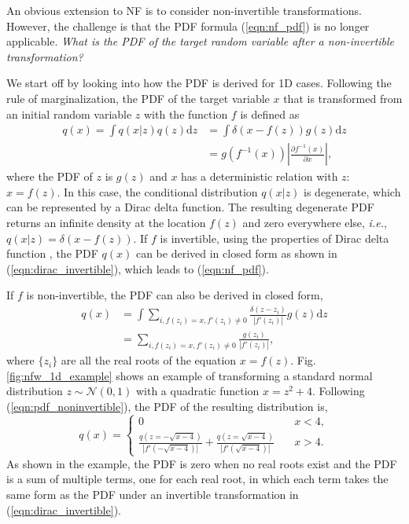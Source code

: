 \documentclass[twoside]{article}
\newcommand{\diff}{\text{d}}
\newcommand{\ie}{\textit{i.e.}}
\begin{document}
An obvious extension to NF is to consider non-invertible transformations. However, the challenge is that the PDF formula (\ref{eqn:nf_pdf}) is no longer applicable. \textit{What is the PDF of the target random variable after a non-invertible transformation?}

We start off by looking into how the PDF is derived for 1D cases. Following the rule of marginalization, the PDF of the target variable $x$ that is transformed from an initial random variable $z$ with the function $f$ is defined as 
\begin{equation}
\begin{split}
q(x) = \int q(x|z) q(z) \diff z &= \int \delta\left(x - f(z)\right) g(z) \diff z\\
 &= g(f^{-1}(x)) \left|\frac{\partial f^{-1}(x)}{\partial x}\right|,
\end{split}
\label{eqn:dirac_invertible}
\end{equation}
where the PDF of $z$ is $g(z)$ and $x$ has a deterministic relation with $z$: $x=f(z)$. In this case, the conditional distribution $q(x|z)$ is degenerate, which can be represented by a Dirac delta function. The resulting degenerate PDF returns an infinite density at the location $f(z)$ and zero everywhere else, \ie, $q(x|z) = \delta\left(x - f(z)\right)$. If $f$ is invertible, using the properties of Dirac delta function \citep{Arfken1985}, the PDF $q(x)$ can be derived in closed form as shown in (\ref{eqn:dirac_invertible}), which leads to (\ref{eqn:nf_pdf}).

If $f$ is non-invertible, the PDF can also be derived in closed form,
\begin{equation}
\begin{split}
q(x)  &= \int \sum_{i, f(z_i)=x, f'(z_i)\neq0} \frac{\delta(z - z_i)}{|f'(z_i)|} g(z) \diff z\\
 &= \sum_{i, f(z_i)=x, f'(z_i)\neq0} \frac{g(z_i)}{|f'(z_i)|}, \label{eqn:pdf_noninvertible}
\end{split}
\end{equation}
where $\{z_i\}$ are all the real roots of the equation $x=f(z)$. Fig.\,\ref{fig:nfw_1d_example} shows an example of transforming a standard normal distribution $z \sim \mathcal{N}(0,1)$ with a  quadratic function $x=z^2+4$. Following (\ref{eqn:pdf_noninvertible}), the PDF of the resulting distribution is, 
\begin{equation*}
q(x) =   
\begin{cases}
  0 & \quad x<4, \\
\frac{q(z=-\sqrt{x-4})}{|f'(-\sqrt{x-4})|}+\frac{q(z=\sqrt{x-4})}{|f'(\sqrt{x-4})|}  & \quad x>4.
\end{cases}
\end{equation*}
As shown in the example, the PDF is zero when no real roots exist and the PDF is a sum of multiple terms, one for each real root, in which each term takes the same form as the PDF under an invertible transformation in (\ref{eqn:dirac_invertible}).
\end{document}
